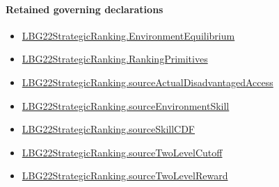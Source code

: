 \documentclass[10pt]{article}
\begin{document}
\paragraph{Retained governing declarations}
\begin{itemize}\raggedright
\item \hyperlink{paper-prerequisite-b8e06f39e94d0049}{LBG22\allowbreak{}Strategic\allowbreak{}Ranking.\allowbreak{}Environment\allowbreak{}Equilibrium}
\item \hyperlink{paper-prerequisite-9bbcc12f4a1736bf}{LBG22\allowbreak{}Strategic\allowbreak{}Ranking.\allowbreak{}Ranking\allowbreak{}Primitives}
\item \hyperlink{paper-prerequisite-6f1ee9b200124096}{LBG22\allowbreak{}Strategic\allowbreak{}Ranking.\allowbreak{}source\allowbreak{}Actual\allowbreak{}Disadvantaged\allowbreak{}Access}
\item \hyperlink{paper-prerequisite-73413973c7594479}{LBG22\allowbreak{}Strategic\allowbreak{}Ranking.\allowbreak{}source\allowbreak{}Environment\allowbreak{}Skill}
\item \hyperlink{governing-declaration-15b79809af308d40}{LBG22\allowbreak{}Strategic\allowbreak{}Ranking.\allowbreak{}source\allowbreak{}Skill\allowbreak{}CDF}
\item \hyperlink{paper-prerequisite-f88aac58507e44ca}{LBG22\allowbreak{}Strategic\allowbreak{}Ranking.\allowbreak{}source\allowbreak{}Two\allowbreak{}Level\allowbreak{}Cutoff}
\item \hyperlink{paper-prerequisite-30d97cd43eb79017}{LBG22\allowbreak{}Strategic\allowbreak{}Ranking.\allowbreak{}source\allowbreak{}Two\allowbreak{}Level\allowbreak{}Reward}
\end{itemize}
\end{document}

